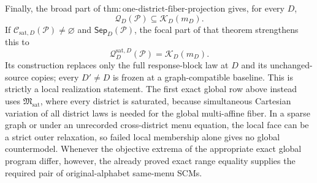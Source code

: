 Finally, the broad part of \(\mathrm{thm:one\text{-}district\text{-}fiber\text{-}projection}\) gives, for every \(D\),
\[
\mathcal Q_D(\mathcal P)\subseteq\mathcal K_D(m_D).
\]
If \(\mathcal C_{\mathrm{sat},D}(\mathcal P)\ne\varnothing\) and \(\mathsf{Sep}_D(\mathcal P)\), the focal part of that theorem strengthens this to
\[
\mathcal Q_D^{\mathrm{sat},D}(\mathcal P)=\mathcal K_D(m_D).
\]
Its construction replaces only the full response-block law at \(D\) and its unchanged-source copies; every \(D'\ne D\) is frozen at a graph-compatible baseline.  This is strictly a local realization statement.  The first exact global row above instead uses \(\mathfrak M_{\mathrm{sat}}\), where every district is saturated, because simultaneous Cartesian variation of all district laws is needed for the global multi-affine fiber.  In a sparse graph or under an unrecorded cross-district menu equation, the local face can be a strict outer relaxation, so failed local membership alone gives no global countermodel.  Whenever the objective extrema of the appropriate exact global program differ, however, the already proved exact range equality supplies the required pair of original-alphabet same-menu SCMs.